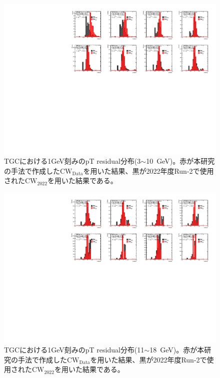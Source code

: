 \begin{figure}[htb]
  \centering
  \hspace*{-1cm}
  \includegraphics[clip, width=16cm]{fig/5/residual_Data_3_10.pdf}
  \caption{TGCにおける1GeV刻みのpT residual分布(3$\sim$10~GeV)。赤が本研究の手法で作成した$\mathrm{CW_{Data}}$を用いた結果、黒が2022年度Run-2で使用された$\mathrm{CW_{2022}}$を用いた結果である。}
  \label{residual_Data_3_10}
\end{figure}
\begin{figure}[htb]
  \centering
  \hspace*{-1cm}
  \includegraphics[clip, width=16cm]{fig/5/residual_Data_11_18.pdf}
  \caption{TGCにおける1GeV刻みのpT residual分布(11$\sim$18~GeV)。赤が本研究の手法で作成した$\mathrm{CW_{Data}}$を用いた結果、黒が2022年度Run-2で使用された$\mathrm{CW_{2022}}$を用いた結果である。}
  \label{residual_Data_11_18}
\end{figure}
